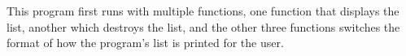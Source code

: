 This program first runs with multiple functions, one function that displays the list, another which destroys the list, and the other three functions switches the format of how the program's list is printed for the user. 